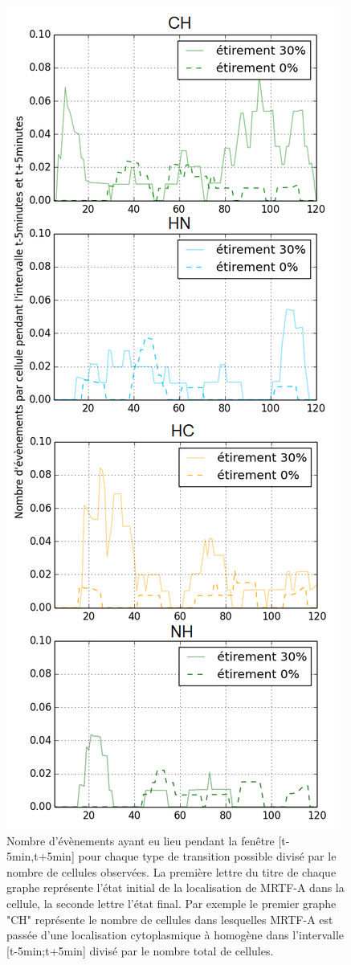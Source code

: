 \documentclass                                                                                                                                                                                                                                                                                                                                       {report}
\begin{document}
 
\begin{figure}[p]
\includegraphics[scale=0.5]{Figures/Etirement30_vs_0_translocations.png}
\caption{\label{Et30_transloc} Nombre d'évènements ayant eu lieu pendant la fenêtre [t-5min,t+5min] pour chaque type de transition possible divisé par le nombre de cellules observées. La première lettre du titre de chaque graphe représente l'état initial de la localisation de MRTF-A dans la cellule, la seconde lettre l'état final. Par exemple le premier graphe "CH" représente le nombre de cellules dans lesquelles MRTF-A est passée d'une localisation cytoplasmique à homogène dans l'intervalle [t-5min;t+5min] divisé par le nombre total de cellules. }
\end{figure}
\end{document}
